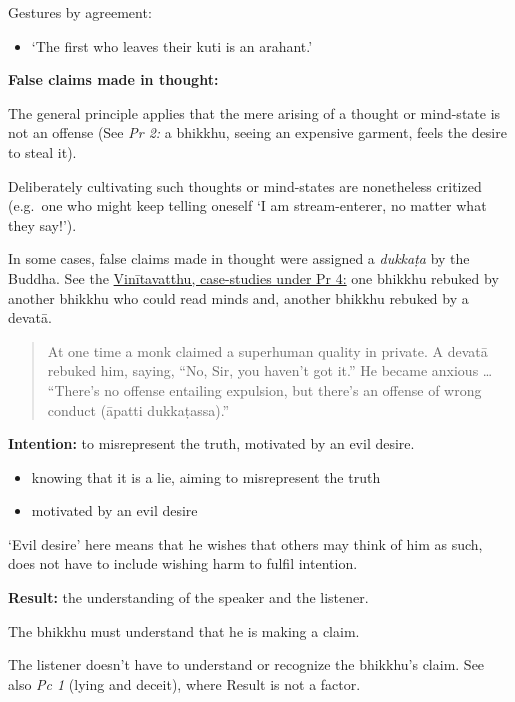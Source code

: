 Gestures by agreement:

\begin{itemize}
\tightlist
\item
  `The first who leaves their kuti is an arahant.'
\end{itemize}

\clearpage

\textbf{False claims made in thought:}

The general principle applies that the mere arising of a thought or
mind-state is not an offense (See \emph{Pr 2:} a bhikkhu, seeing an
expensive garment, feels the desire to steal it).

Deliberately cultivating such thoughts or mind-states are nonetheless
critized (e.g.~one who might keep telling oneself `I am stream-enterer,
no matter what they say!').

In some cases, false claims made in thought were assigned a
\emph{dukkaṭa} by the Buddha. See the
\href{https://suttacentral.net/pli-tv-bu-vb-pj4/en/brahmali}{Vinītavatthu,
case-studies under Pr 4:} one bhikkhu rebuked by another bhikkhu who
could read minds and, another bhikkhu rebuked by a devatā.

\begin{quote}
At one time a monk claimed a superhuman quality in private. A devatā
rebuked him, saying, ``No, Sir, you haven't got it.'' He became anxious
\ldots{} ``There's no offense entailing expulsion, but there's an
offense of wrong conduct (āpatti dukkaṭassa).''
\end{quote}

\textbf{Intention:} to misrepresent the truth, motivated by an evil
desire.

\begin{itemize}
\tightlist
\item
  knowing that it is a lie, aiming to misrepresent the truth
\item
  motivated by an evil desire
\end{itemize}

`Evil desire' here means that he wishes that others may think of him as
such, does not have to include wishing harm to fulfil intention.

\textbf{Result:} the understanding of the speaker and the listener.

The bhikkhu must understand that he is making a claim.

The listener doesn't have to understand or recognize the bhikkhu's
claim. See also \emph{Pc 1} (lying and deceit), where Result is not a
factor.

